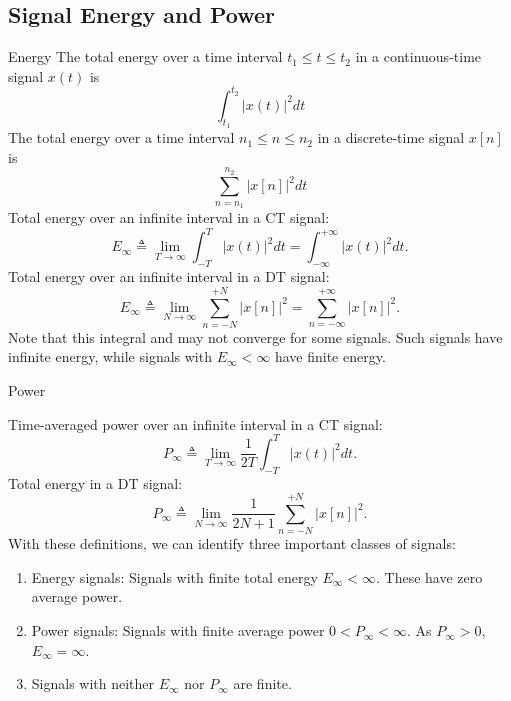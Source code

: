 \subsection{Signal Energy and Power}

\begin{frame}[allowframebreaks]{Energy}
    The total energy over a time interval $t_1 \leq t \leq t_2$ in a continuous-time signal $x(t)$ is
    \begin{equation*}
        \int_{t_1}^{t_2}|x(t)|^2dt
    \end{equation*}
    The total energy over a time interval $n_1 \leq n \leq n_2$ in a discrete-time signal $x[n]$ is
    \begin{equation*}
        \sum_{n= n_1}^{n_2}|x[n]|^2dt
    \end{equation*}
    Total energy  over an infinite interval in a CT signal:
    \begin{equation}
        E_\infty \triangleq \lim_{T \rightarrow \infty} \int_{-T}^{T}|x(t)|^2dt =  \int_{-\infty}^{+\infty}|x(t)|^2dt.
    \end{equation}
    Total energy  over an infinite interval in a DT signal:
    \begin{equation}
      E_\infty \triangleq \lim_{N \rightarrow \infty} \sum_{n = -N}^{+N}|x[n]|^2 =  \sum_{n=-\infty}^{+\infty}|x[n]|^2.
    \end{equation}
    Note that this integral and may not converge for some signals. Such signals have infinite energy, while signals with $E_\infty < \infty$ have finite energy.
\end{frame}


\begin{frame}{Power}

    Time-averaged power over an infinite interval in a CT signal:
    \begin{equation}
        P_\infty \triangleq \lim_{T \rightarrow \infty} \frac{1}{2T}\int_{-T}^{T}|x(t)|^2dt.
    \end{equation}
    Total energy in a DT signal:
    \begin{equation}
      P_\infty \triangleq \lim_{N \rightarrow \infty} \frac{1}{2N+1}\sum_{n = -N}^{+N}|x[n]|^2.
    \end{equation}
    With these definitions, we can identify three important classes of signals:
    \begin{enumerate}
        \item Energy signals: Signals with finite total energy $E_\infty < \infty$. These have zero average power.
        \item Power signals: Signals with finite average power $0 < P_\infty < \infty$. As $P_\infty > 0$, $E_\infty = \infty$.
        \item Signals with neither $E_\infty$ nor $P_\infty$ are finite.
    \end{enumerate}
\end{frame} 